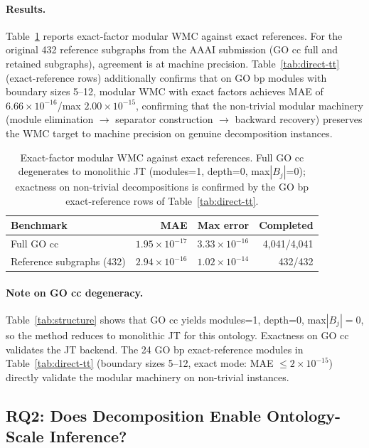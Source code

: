 \documentclass[12pt]{article}
\begin{document}
\paragraph{Results.}
Table~\ref{tab:exactness} reports exact-factor modular WMC against exact
references. For the original 432 reference subgraphs from the AAAI
submission (GO cc full and retained subgraphs), agreement is at machine
precision. Table~\ref{tab:direct-tt} (exact-reference rows) additionally
confirms that on GO bp modules with boundary sizes 5--12, modular WMC
with exact factors achieves MAE of $6.66\times10^{-16}$/max
$2.00\times10^{-15}$, confirming that the non-trivial modular machinery
(module elimination $\to$ separator construction $\to$ backward
recovery) preserves the WMC target to machine precision on genuine
decomposition instances.

\begin{table}[t]
\centering
\small
\begin{tabular}{lrrr}
\toprule
Benchmark & MAE & Max error & Completed \\
\midrule
Full GO cc & $1.95{\times}10^{-17}$ & $3.33{\times}10^{-16}$ & 4,041/4,041 \\
Reference subgraphs (432) & $2.94{\times}10^{-16}$ & $1.02{\times}10^{-14}$ & 432/432 \\
\bottomrule
\end{tabular}
\caption{Exact-factor modular WMC against exact references.
Full GO cc degenerates to monolithic JT (modules=1, depth=0, max$|B_j|$=0);
exactness on non-trivial decompositions is confirmed by the GO bp
exact-reference rows of Table~\ref{tab:direct-tt}.}
\label{tab:exactness}
\end{table}

\paragraph{Note on GO cc degeneracy.}
Table~\ref{tab:structure} shows that GO cc yields modules=1, depth=0,
max$|B_j|=0$, so the method reduces to monolithic JT for this
ontology. Exactness on GO cc validates the JT backend. The 24 GO bp
exact-reference modules in Table~\ref{tab:direct-tt} (boundary sizes
5--12, exact mode: MAE $\leq 2\times10^{-15}$) directly validate the
modular machinery on non-trivial instances.

\subsection{RQ2: Does Decomposition Enable Ontology-Scale Inference?}
\label{sec:rq2}
\end{document}
